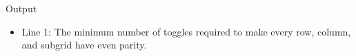 Output
\begin{itemize}
	\item      Line 1: The minimum number of toggles required to make every row,         column, and subgrid have even parity.    
\end{itemize}